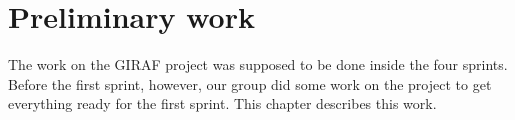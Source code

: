 \chapter{Preliminary work}

The work on the GIRAF project was supposed to be done inside the four sprints. Before the first sprint, however, our group did some work on the project to get everything ready for the first sprint. This chapter describes this work.